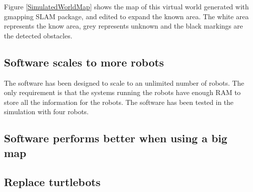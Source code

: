 \documentclass[10pt, journal]{IEEEtran}
\begin{document}
Figure \ref{SimulatedWorldMap} shows the map of this virtual world generated with gmapping SLAM package\cite{SLAMGmapping}, and edited to expand the known area. The white area represents the know area, grey represents unknown and the black markings are the detected obstacles.
\subsection{Software scales to more robots}
The software has been designed to scale to an unlimited number of robots. The only requirement is that the systems running the robots have enough RAM to store all the information for the robots. The software has been tested in the simulation with four robots.
\subsection{Software performs better when using a big map}
\lipsum[15-16]
\subsection{Replace turtlebots}
\lipsum[10-11]



\end{document}
